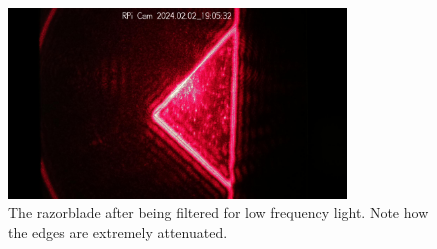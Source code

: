 \documentclass[letterpaper, reqno,11pt]{article}
\begin{document}
\begin{figure}[tb]
    \centering
    \includegraphics[width=0.8\textwidth]{Fourier/5g/media/im_0229_20240202_190532.jpg}
    \caption{The razorblade after being filtered for low frequency light. Note how the edges are extremely attenuated.}
    \label{fig:2-3-5G}
\end{figure}
\end{document}
